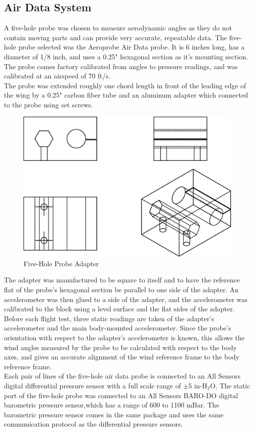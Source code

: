 \subsection*{Air Data System}
A five-hole probe was chosen to measure aerodynamic angles as they do not contain moving parts and can provide very accurate, repeatable data. The five-hole probe selected was the Aeroprobe Air Data probe. It is 6 inches long, has a diameter of 1/8 inch, and uses a 0.25" hexagonal section as it's mounting section. The probe comes factory calibrated from angles to pressure readings, and was calibrated at an airspeed of 70 ft/s.\\
The probe was extended roughly one chord length in front of the leading edge of the wing by a 0.25" carbon fiber tube and an aluminum adapter which connected to the probe using set screws.
\begin{figure}[H]

  \centering
    \includegraphics[width=.5\textwidth]{figures/probeAdapter.eps}
      \caption{Five-Hole Probe Adapter} \label{fig:probeAdapter}
\end{figure}
The adapter was manufactured to be square to itself and to have the reference flat of the probe's hexagonal section be parallel to one side of the adapter. An accelerometer was then glued to a side of the adapter, and the accelerometer was calibrated to the block using a level surface and the flat sides of the adapter. Before each flight test, three static readings are taken of the adapter's accelerometer and the main body-mounted accelerometer. Since the probe's orientation with respect to the adapter's accelerometer is known, this allows the wind angles measured by the probe to be calculated with respect to the body axes, and gives an accurate alignment of the wind reference frame to the body reference frame.\\

 Each pair of lines of the five-hole air data probe is connected to an All Sensors digital differential pressure sensor with a full scale range of $\pm$5 in-H$_2$O\cite{allsensorsDDO}. The static port of the five-hole probe was connected to an All Sensors BARO-DO digital barometric pressure sensor,which has a range of 600 to 1100 mBar\cite{allSensorsBaroDatasheet}. The barometric pressure sensor comes in the same package and uses the same communication protocol as the differential pressure sensors.

